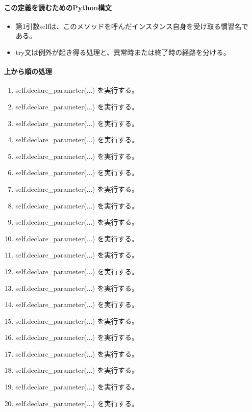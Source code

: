 \documentclass[a4paper,11pt]{article}
\begin{document}
            \paragraph{この定義を読むためのPython構文}
            \begin{itemize}[leftmargin=1.6em]
            \item 第1引数selfは、このメソッドを呼んだインスタンス自身を受け取る慣習名である。
\item try文は例外が起き得る処理と、異常時または終了時の経路を分ける。
            \end{itemize}
            \paragraph{上から順の処理}
            \begin{enumerate}[leftmargin=1.8em]
            \item self.declare\_parameter(...) を実行する。
\item self.declare\_parameter(...) を実行する。
\item self.declare\_parameter(...) を実行する。
\item self.declare\_parameter(...) を実行する。
\item self.declare\_parameter(...) を実行する。
\item self.declare\_parameter(...) を実行する。
\item self.declare\_parameter(...) を実行する。
\item self.declare\_parameter(...) を実行する。
\item self.declare\_parameter(...) を実行する。
\item self.declare\_parameter(...) を実行する。
\item self.declare\_parameter(...) を実行する。
\item self.declare\_parameter(...) を実行する。
\item self.declare\_parameter(...) を実行する。
\item self.declare\_parameter(...) を実行する。
\item self.declare\_parameter(...) を実行する。
\item self.declare\_parameter(...) を実行する。
\item self.declare\_parameter(...) を実行する。
\item self.declare\_parameter(...) を実行する。
\item self.declare\_parameter(...) を実行する。
\item self.declare\_parameter(...) を実行する。

\end{enumerate}
\end{document}
